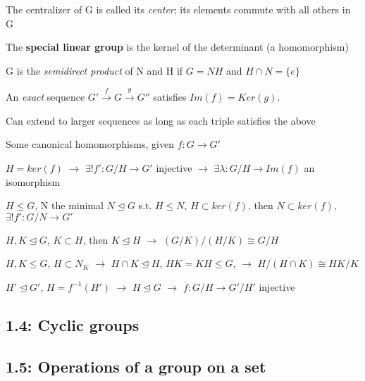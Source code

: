 \documentclass[12pt]{article}
\begin{document}
The centralizer of G is called its \textit{center}; its elements commute with all others in G

\noindent
The \textbf{special linear group} is the kernel of the determinant (a homomorphism)

\noindent
G is the \textit{semidirect product} of N and H if $G=NH$ and $H\cap N = \{e\}$

\noindent
An \textit{exact} sequence $G' \xrightarrow{f} G \xrightarrow{g} G''$ satisfies $Im(f) = Ker(g)$.

Can extend to larger sequences as long as each triple satisfies the above

\noindent
Some canonical homomorphisms, given $f: G \to G'$

$H = ker(f)$ $\to$ $\exists !f': G\slash H \to G'$ injective $\to$ $\exists\lambda: G\slash H \to Im(f)$ an isomorphism

$H \leq G$, N the minimal $N \trianglelefteq G$ s.t. $H \leq N$, $H \subset ker(f)$, then $N \subset ker(f)$, $\exists ! f': G\slash N \to G'$

$H, K \trianglelefteq G$, $K \subset H$, then $K \trianglelefteq H$ $\to$ $(G\slash K)\slash (H \slash K) \cong G \slash H$

$H, K \leq G$, $H \subset N_K$ $\to$ $H \cap K \trianglelefteq H$, $HK = KH \leq G$, $\to$ $H\slash(H\cap K) \cong HK\slash K$

$H' \trianglelefteq G'$, $H = f^{-1}(H')$ $\to$ $H \trianglelefteq G$ $\to$ $\overline{f}: G\slash H \to G'\slash H'$ injective

\noindent


\subsection{1.4: Cyclic groups}



\subsection{1.5: Operations of a group on a set}
\end{document}
